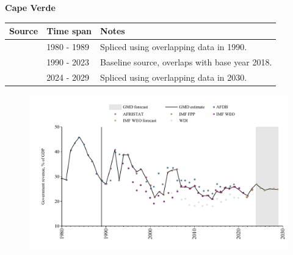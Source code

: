 \documentclass[12pt,a4paper,landscape]{article}
\begin{document}
\begin{adjustbox}{max totalsize={\paperwidth}{\paperheight},center}
\begin{minipage}[t][\textheight][t]{\textwidth}
\vspace*{0.5cm}
{}
\begin{center}
{\Large\bfseries Cape Verde}
\end{center}
\vspace{0.5cm}
\begin{table}[H]
\centering
\small
\begin{tabular}{|l|l|l|}
\hline
\textbf{Source} & \textbf{Time span} & \textbf{Notes} \\
\hline
\rowcolor{white}\cite{AFDB}& 1980 - 1989 &Spliced using overlapping data in 1990.\\
\rowcolor{lightgray}\cite{AFRISTAT}& 1990 - 2023 &Baseline source, overlaps with base year 2018.\\
\rowcolor{white}\cite{IMF_WEO_forecast}& 2024 - 2029 &Spliced using overlapping data in 2030.\\
\hline
\end{tabular}
\end{table}
\begin{figure}[H]
\centering
\includegraphics[width=\textwidth,height=0.6\textheight,keepaspectratio]{graphs/CPV_govrev_GDP.pdf}
\end{figure}
\end{minipage}
\end{adjustbox}
\end{document}
